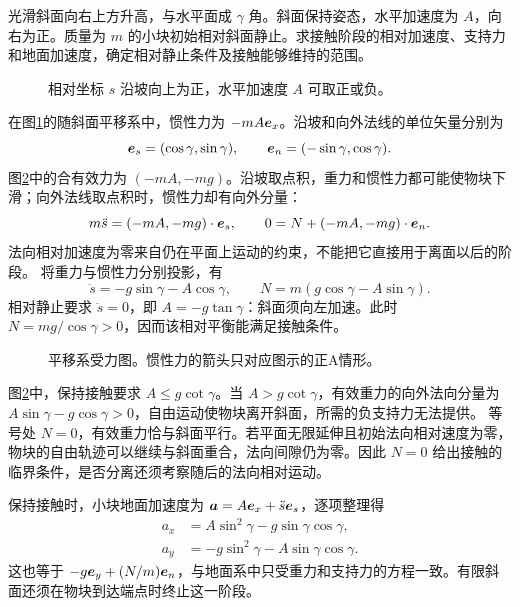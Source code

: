 \begin{example}[加速斜面上的相对运动]\label{rot:problem-example-1}\label{rot:ex:d6-e1}
光滑斜面向右上方升高，与水平面成 $\gamma$ 角。斜面保持姿态，水平加速度为 $A$，向右为正。质量为 $m$ 的小块初始相对斜面静止。求接触阶段的相对加速度、支持力和地面加速度，确定相对静止条件及接触能够维持的范围。
\end{example}
\begin{figure}[H]\centering
{}
\caption{相对坐标 $s$ 沿坡向上为正，水平加速度 $A$ 可取正或负。}\label{rot:fig:d6-e1-q}
\end{figure}
\begin{solution}
在图\ref{rot:fig:d6-e1-q}的随斜面平移系中，惯性力为 $-mA\bm{e}_x$。沿坡和向外法线的单位矢量分别为
\[
\bm{e}_s=(\cos\gamma,\sin\gamma),\qquad
\bm{e}_n=(-\sin\gamma,\cos\gamma).
\]
图\ref{rot:fig:d6-e1-s}中的合有效力为 $(-mA,-mg)$。沿坡取点积，重力和惯性力都可能使物块下滑；向外法线取点积时，惯性力却有向外分量：
\[
m\ddot s=(-mA,-mg)\cdot\bm{e}_s,\qquad
0=N+(-mA,-mg)\cdot\bm{e}_n.
\]
法向相对加速度为零来自仍在平面上运动的约束，不能把它直接用于离面以后的阶段。
将重力与惯性力分别投影，有
\[
\ddot s=-g\sin\gamma-A\cos\gamma,\qquad
N=m(g\cos\gamma-A\sin\gamma).
\]
相对静止要求 $\ddot s=0$，即 $A=-g\tan\gamma$：斜面须向左加速。此时 $N=mg/\cos\gamma>0$，因而该相对平衡能满足接触条件。
\begin{figure}[H]\centering
{}
\caption{平移系受力图。惯性力的箭头只对应图示的正A情形。}\label{rot:fig:d6-e1-s}
\end{figure}
图\ref{rot:fig:d6-e1-s}中，保持接触要求 $A\le g\cot\gamma$。当 $A>g\cot\gamma$，有效重力的向外法向分量为 $A\sin\gamma-g\cos\gamma>0$，自由运动使物块离开斜面，所需的负支持力无法提供。
等号处 $N=0$，有效重力恰与斜面平行。若平面无限延伸且初始法向相对速度为零，物块的自由轨迹可以继续与斜面重合，法向间隙仍为零。因此 $N=0$ 给出接触的临界条件，是否分离还须考察随后的法向相对运动。

保持接触时，小块地面加速度为 $\bm{a}=A\bm{e}_x+\ddot s\bm{e}_s$，逐项整理得
\[
\begin{aligned}
a_x&=A\sin^2\gamma-g\sin\gamma\cos\gamma,\\
a_y&=-g\sin^2\gamma-A\sin\gamma\cos\gamma.
\end{aligned}
\]
这也等于 $-g\bm{e}_y+(N/m)\bm{e}_n$，与地面系中只受重力和支持力的方程一致。有限斜面还须在物块到达端点时终止这一阶段。
\end{solution}
